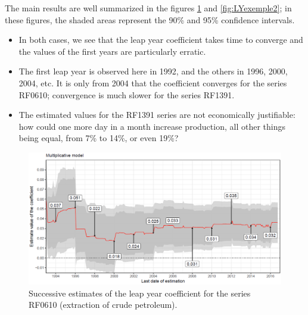 \documentclass[12pt, a4paper]{article}
\begin{document}
The main results are well summarized in the figures \ref{fig:LYexemple1} and \ref{fig:LYexemple2}; in these figures, the shaded areas represent the 90\% and 95\% confidence intervals.
\begin{itemize}
	\item In both cases, we see that the leap year coefficient takes time to converge and the values of the first years are particularly erratic.
	\item The first leap year is observed here in 1992, and the others in 1996, 2000, 2004, etc. It is only from 2004 that the coefficient converges for the series RF0610; convergence is much slower for the series RF1391.
	\item The estimated values for the RF1391 series are not economically justifiable: how could one more day in a month increase production, all other things being equal, from 7\% to 14\%, or even 19\%?
\end{itemize}

\begin{figure}[!ht]
\begin{center}
 \includegraphics[scale=0.50]{img/LYexemple1.png}
 \caption[Successive estimates of the leap year coefficient for the series RF0610 (extraction of crude
petroleum)]{Successive estimates of the leap year coefficient for the series RF0610 (extraction of crude
petroleum).}
 \label{fig:LYexemple1}
\end{center}
\end{figure}
\end{document}
